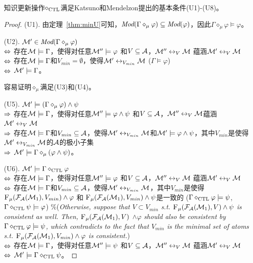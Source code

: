 \begin{theorem}\label{thm:U1toU8}
	知识更新操作$\diamond_{\textrm{CTL}}$满足Katsuno和Mendelzon提出的基本条件(U1)-(U8)。
\end{theorem}
\begin{proof}
	(U1). 由定理~\ref{thm:minU}可知，$\textit{Mod}(\Gamma \diamond_{\mu} \varphi) \subseteq \textit{Mod}(\varphi)$，因此$\Gamma \diamond_{\mu} \varphi \models \varphi$。
	
	(U2). ${\cal M}'\in \textit{Mod}(\Gamma \diamond_{\mu} \varphi)$\\
	$\Leftrightarrow$ 存在${\cal M} \models \Gamma$，使得对任意${\cal M}'' \models \varphi$ 和$V \subseteq {\cal A}$，${\cal M}'' \leftrightarrow_{V} {\cal M}$ 蕴涵${\cal M}' \leftrightarrow_{V} {\cal M}$\\
	$\Leftrightarrow$ 存在${\cal M} \models \Gamma$和$V_{min} = \emptyset$，使得${\cal M}' \leftrightarrow_{V_{min}} {\cal M}$ \hfill ($\Gamma \models \varphi$)\\
	$\Leftrightarrow$ ${\cal M}'\models \Gamma$。
	
	
	容易证明$\diamond_{\mu}$满足(U3)和(U4)。
	
	(U5). ${\cal M}'\models (\Gamma \diamond_{\mu} \varphi) \wedge \psi$\\
	$\Rightarrow$  存在${\cal M} \models \Gamma$，使得对任意${\cal M}'' \models \varphi \wedge \psi$ 和$V \subseteq {\cal A}$，${\cal M}'' \leftrightarrow_{V} {\cal M}$蕴涵${\cal M}' \leftrightarrow_{V} {\cal M}$\\
	$\Rightarrow$ 存在${\cal M} \models \Gamma$和$V_{min} \subseteq {\cal A}$，使得${\cal M}' \leftrightarrow_{V_{min}} {\cal M}$和${\cal M}' \models \varphi \wedge \psi$，其中$V_{min}$是使得${\cal M}' \leftrightarrow_{V_{min}} {\cal M}$的${\cal A}$的极小子集\\
	$\Rightarrow$ ${\cal M}' \models \Gamma \diamond_{\mu} (\varphi \wedge \psi)$。
	
	
	
	(U6). ${\cal M}'\models \Gamma \diamond_{\textrm{CTL}} \varphi$\\
	$\Leftrightarrow$ 存在${\cal M} \models \Gamma$，使得对任意${\cal M}'' \models \varphi$ 和$V \subseteq {\cal A}$，${\cal M}'' \leftrightarrow_{V} {\cal M}$ 蕴涵${\cal M}' \leftrightarrow_{V} {\cal M}$\\
	$\Leftrightarrow$ 存在${\cal M} \models \Gamma$和$V_{min} \subseteq {\cal A}$，使得${\cal M}' \leftrightarrow_{V_{min}} {\cal M}$，其中$V_{min}$是使得${\textsc{F}_{\textsc{$\mu$}}}({\cal F}_{{\cal A}}({\cal M}_1), V_{min}) \wedge \varphi$ 和 ${\textsc{F}_{\textsc{$\mu$}}}({\cal F}_{{\cal A}}({\cal M}_1), V_{min}) \wedge \psi$是一致的 \hfill ($\Gamma \diamond_{\textrm{CTL}} \varphi \models \psi$, $\Gamma \diamond_{\textrm{CTL}} \psi \models \varphi$)  \qquad \qquad \textcolor[RGB]{0,134,139}{$\%$({\em Otherwise, suppose that $V\subset V_{min}$ s.t. ${\textsc{F}_{\textsc{$\mu$}}}({\cal F}_{{\cal A}}({\cal M}_1), V) \wedge \psi$ is consistent as well. Then, ${\textsc{F}_{\textsc{$\mu$}}}({\cal F}_{{\cal A}}({\cal M}_1), V)$ $\wedge \varphi$ should also be consistent by $\Gamma \diamond_{\textrm{CTL}} \varphi \models \psi$, which contradicts to the fact that $V_{min}$ is the minimal set of atoms s.t. ${\textsc{F}_{\textsc{$\mu$}}}({\cal F}_{{\cal A}}({\cal M}_1), V_{min}) \wedge \varphi$ is consistent.})} \\
	$\Leftrightarrow$ 存在${\cal M} \models \Gamma$，使得对任意${\cal M}'' \models \psi$ 和$V \subseteq {\cal A}$，${\cal M}'' \leftrightarrow_{V} {\cal M}$ 蕴涵${\cal M}' \leftrightarrow_{V} {\cal M}$\\
	$\Leftrightarrow$ ${\cal M}' \models \Gamma \diamond_{\textrm{CTL}} \psi$。
	

\end{proof}
